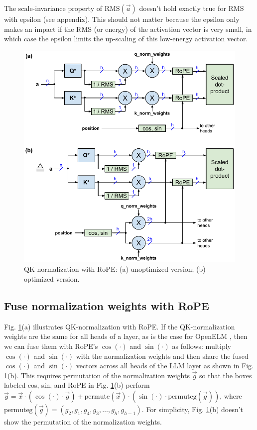 \documentclass{article}
\def\rms{\text{RMS}(\vec{a})}         %
\def\vx{\vec{x}}                      %
\def\vy{\vec{y}}                      %
\def\vg{\vec{g}}                      %
\def\cosi{\cos{(\cdot)}}              %
\def\sini{\sin{(\cdot)}}              %
\begin{document}
The scale-invariance property of $\rms$ doesn’t hold exactly true for RMS with epsilon (see appendix). This should not matter because the epsilon only makes an impact if the RMS (or energy) of the activation vector is very small, in which case the epsilon limits the up-scaling of this low-energy activation vector.

\begin{figure}[h!] \centering
  \includegraphics[scale=0.9]{../doc/fig/flashNorm_fig7.pdf}
  \caption{QK-normalization with RoPE: (a) unoptimized version; (b) optimized version.}
\label{fig7} \end{figure}

\subsection{Fuse normalization weights with RoPE}
Fig. \ref{fig7}(a) illustrates QK-normalization with RoPE. If the QK-normalization weights are the same for all heads of a layer, as is the case for OpenELM \citep{openelm}, then we can fuse them with RoPE's $\cosi$ and $\sini$ as follows: multiply $\cosi$ and $\sini$ with the normalization weights and then share the fused $\cosi$ and $\sini$ vectors across all heads of the LLM layer as shown in Fig. \ref{fig7}(b). This requires permutation of the normalization weights $\vg$ so that the boxes labeled cos, sin, and RoPE in Fig. \ref{fig7}(b) perform $\vy = \vx \cdot \left( \cosi \cdot \vg \right) + \text{permute}(\vx) \cdot \left( \sini \cdot \text{permuteg}(\vg) \right)$, where $\text{permuteg}(\vg) = (g_2, g_1, g_4, g_3, \dots, g_h, g_{h-1})$. For simplicity, Fig. \ref{fig7}(b) doesn't show the permutation of the normalization weights.
\end{document}
